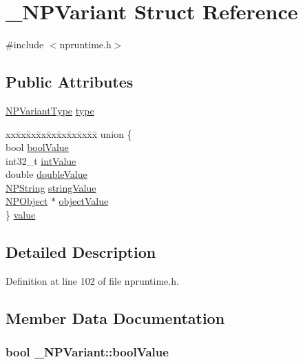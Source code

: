 \hypertarget{struct___n_p_variant}{
\section{\_\-NPVariant Struct Reference}
\label{struct___n_p_variant}
}


{\ttfamily \#include $<$npruntime.h$>$}

\subsection*{Public Attributes}
\begin{DoxyCompactItemize}
\item 
\hyperlink{npruntime_8h_ac7d60e54d09402208354d7700187916d}{NPVariantType} \hyperlink{struct___n_p_variant_a70be375a4c0bb8071628ad21682e3f70}{type}
\item 
\begin{tabbing}
xx\=xx\=xx\=xx\=xx\=xx\=xx\=xx\=xx\=\kill
union \{\\
\>bool \hyperlink{struct___n_p_variant_a080199c3605623896342d345cfd25080}{boolValue}\\
\>int32\_t \hyperlink{struct___n_p_variant_a0099a5d52f1601aa7d4c15df4aa42f05}{intValue}\\
\>double \hyperlink{struct___n_p_variant_a8977f45878e22f3b9a51ee0f19998fbe}{doubleValue}\\
\>\hyperlink{struct___n_p_string}{NPString} \hyperlink{struct___n_p_variant_a1d5497be17b1b6d84a5830c2160e82ca}{stringValue}\\
\>\hyperlink{struct_n_p_object}{NPObject} $\ast$ \hyperlink{struct___n_p_variant_a061fbdaf1fdb181af2329408edd0aa74}{objectValue}\\
\} \hyperlink{struct___n_p_variant_a4b26515a9d3d12fced174514d8fcc39f}{value}\\

\end{tabbing}\end{DoxyCompactItemize}


\subsection{Detailed Description}


Definition at line 102 of file npruntime.h.



\subsection{Member Data Documentation}
\hypertarget{struct___n_p_variant_a080199c3605623896342d345cfd25080}{
\subsubsection[{boolValue}]{\setlength{\rightskip}{0pt plus 5cm}bool {\bf \_\-NPVariant::boolValue}}}
\label{struct___n_p_variant_a080199c3605623896342d345cfd25080}


